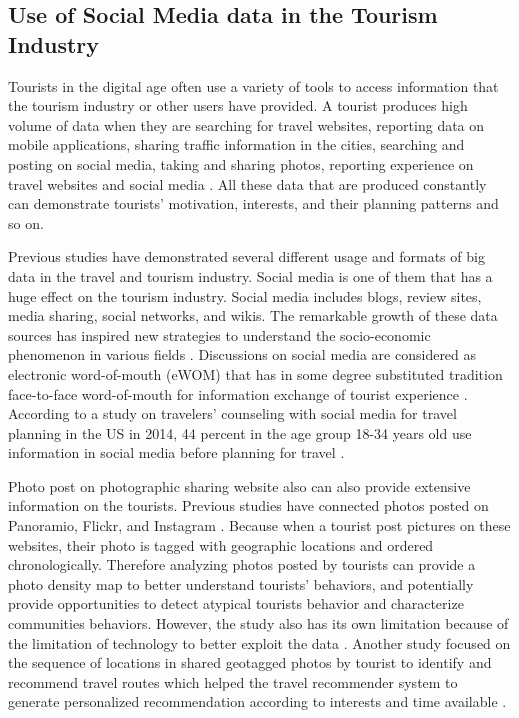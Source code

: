 \documentclass[sigconf]{acmart}
\begin{document}
\subsection{Use of Social Media data in the Tourism Industry}
Tourists in the digital age often use a variety of tools to access information that
the tourism industry or other users have provided. A tourist produces high volume of
data when they are searching for travel websites, reporting data on mobile
applications, sharing traffic information in the cities, searching and posting on
social media, taking and sharing photos, reporting experience on travel websites and
social media \cite{akerkar2012, Shafiee16}. All these data that are produced
constantly can demonstrate tourists’ motivation, interests, and their planning
patterns and so on.

Previous studies have demonstrated several different usage and formats of big data in the travel
and tourism industry. Social media is one of them that has a huge effect on the
tourism industry. Social media includes blogs, review sites, media sharing, social
networks, and wikis. The remarkable growth of these data sources has inspired new
strategies to understand the socio-economic phenomenon in various fields
\cite{Shafiee16}. Discussions on social media are considered as electronic
word-of-mouth (eWOM) that has in some degree substituted tradition face-to-face
word-of-mouth for information exchange of tourist experience \cite{chung2009}.
According to a study on travelers' counseling with social media for travel planning in
the US in 2014, 44 percent in the age group 18-34 years old use information in social
media before planning for travel \cite{statistics14}.


Photo post on photographic sharing website also can also provide extensive information
on the tourists. Previous studies have connected photos posted on Panoramio, Flickr,
and Instagram \cite{GJT14, MIAH2017}. Because when a tourist post pictures on these
websites, their photo is tagged with geographic locations and ordered chronologically.
Therefore analyzing photos posted by tourists can provide a photo density map to
better understand tourists' behaviors, and potentially provide opportunities to detect
atypical tourists behavior and characterize communities behaviors. However, the study
also has its own limitation because of the limitation of technology to better exploit
the data \cite{GJT14}. Another study focused on the sequence of locations in shared
geotagged photos by tourist to identify and recommend travel routes which helped the
travel recommender system to generate personalized recommendation according to
interests and time available \cite{kurashima2013travel}. 
\end{document}
